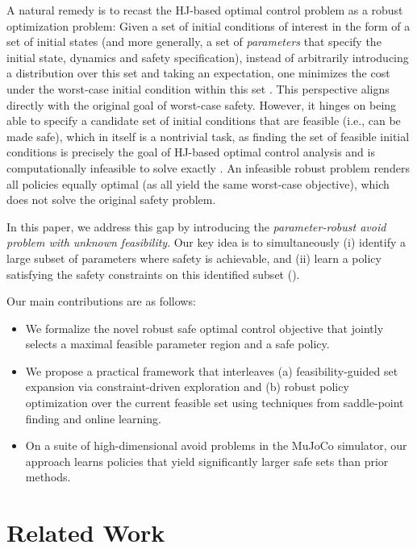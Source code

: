 \documentclass{article} %
\let\Cref\crtCref
\begin{document}
A natural remedy is to recast
the HJ-based optimal control problem
as a robust optimization problem:
Given a set of initial conditions of interest in the form of a set of initial states (and more generally, a set of \textit{parameters} that specify the initial state, dynamics and safety specification), instead of arbitrarily introducing a distribution over this set and taking an expectation, one minimizes the cost under the worst-case initial condition within this set \citep{pinto2017robust}.
This perspective aligns directly with the original goal of worst-case safety.
However, it hinges on being able to specify a candidate set of initial conditions that are feasible (i.e., can be made safe), which in itself is a nontrivial task, as finding the set of feasible initial conditions is precisely the goal of
HJ-based optimal control analysis
and is computationally infeasible to solve exactly \citep{mitchell2007toolbox}.
An infeasible robust problem renders all policies equally optimal (as all yield the same worst-case objective), which does not solve the original safety problem.

In this paper, we address this gap by introducing the \textit{parameter-robust avoid problem with unknown feasibility}.
Our key idea is to simultaneously (i) identify a large subset of parameters where safety is achievable, and (ii) learn a policy satisfying the safety constraints on this identified subset (\Cref{fig:fge_teaser}).

Our main contributions are as follows:
\begin{itemize}[leftmargin=1em,itemsep=0pt]
    \item We formalize the novel robust safe optimal control objective that jointly selects a maximal feasible parameter region and a safe policy.
    \item We propose a practical framework that interleaves (a) feasibility-guided set expansion via constraint-driven exploration and (b) robust policy optimization over the current feasible set using techniques from saddle-point finding and online learning.
    \item On a suite of high-dimensional avoid problems in the MuJoCo simulator, our approach learns policies that yield significantly larger safe sets than prior methods.
\end{itemize}

\section{Related Work} \label{sec:related_work}
\end{document}
